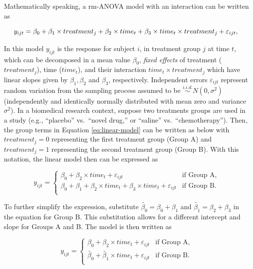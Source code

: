 \documentclass[
]{article}
\begin{document}
Mathematically speaking, a rm-ANOVA model with an interaction can be written as

\begin{equation}
y_{ijt} = \beta_0+\beta_1 \times treatment_{j} +\beta_2 \times time_{t} +\beta_3 \times time_{t}\times treatment_{j}+\varepsilon_{ijt},\\ 
\label{eq:linear-model}
\end{equation}

In this model \(y_{ijt}\) is the response for subject \(i\), in treatment group \(j\) at time \(t\), which can be decomposed in a mean value \(\beta_0\), \emph{fixed effects} of treatment (\(treatment_j\)), time (\(time_t\)), and their interaction \(time_t\times treatment_j\) which have linear slopes given by \(\beta_1, \beta_2\) and \(\beta_3\), respectively. Independent errors \(\varepsilon_{ijt}\) represent random variation from the sampling process assumed to be \(\stackrel{i.i.d.}\sim N(0,\sigma^2)\) (independently and identically normally distributed with mean zero and variance \(\sigma^2\)).
In a biomedical research context, suppose two treatments groups are used in a study (e.g., ``placebo'' vs.~``novel drug,'' or ``saline'' vs.~``chemotherapy''). Then, the group terms in Equation \eqref{eq:linear-model} can be written as below with \(treatment_j=0\) representing the first treatment group (Group A) and \(treatment_j=1\) representing the second treatment group (Group B). With this notation, the linear model then can be expressed as

\begin{equation}
y_{ijt} = \begin{cases}
\beta_0 + \beta_2\times time_{t}+\varepsilon_{ijt}   & \mbox{if Group A},\\
\beta_0 + \beta_1+\beta_2 \times time_{t} +\beta_3 \times time_{t}+\varepsilon_{ijt}  & \mbox{if Group B}.\\
\end{cases}
\label{eq:ANOVA-by-group}
\end{equation}

To further simplify the expression, substitute \(\widetilde{\beta_{0}}=\beta_0+\beta_{1}\) and \(\widetilde{\beta_{1}}=\beta_{2}+\beta_{3}\) in the equation for Group B. This substitution allows for a different intercept and slope for Groups A and B. The model is then written as

\begin{equation}
y_{ijt} = \begin{cases}
\beta_0 + \beta_2\times time_{t}+\varepsilon_{ijt}   & \mbox{if Group A},\\
\widetilde{\beta_{0}} + \widetilde{\beta_1} \times time_{t}+\varepsilon_{ijt}  & \mbox{if Group B}.\\
\end{cases}
\label{eq:ANOVA-lines}
\end{equation}
\end{document}
